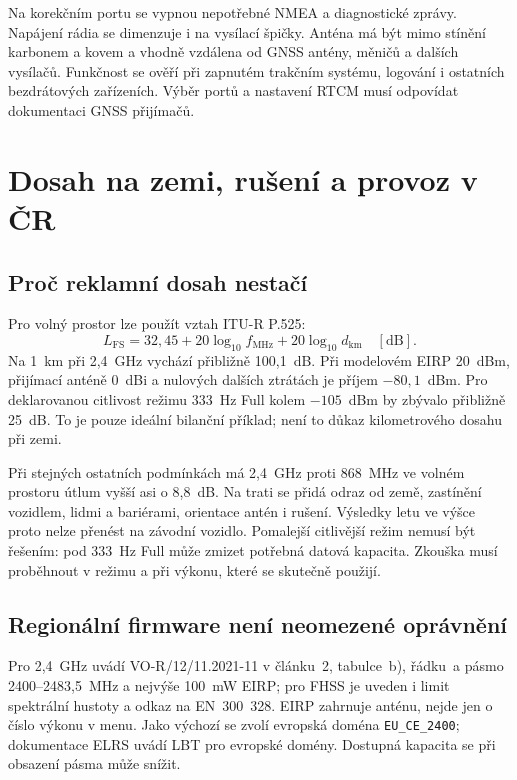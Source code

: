 \documentclass[11pt,a4paper]{article}
\begin{document}
Na korekčním portu se vypnou nepotřebné NMEA a diagnostické zprávy. Napájení rádia se dimenzuje i na vysílací špičky. Anténa má být mimo stínění karbonem a kovem a vhodně vzdálena od GNSS antény, měničů a dalších vysílačů. Funkčnost se ověří při zapnutém trakčním systému, logování i ostatních bezdrátových zařízeních. Výběr portů a nastavení RTCM musí odpovídat dokumentaci GNSS přijímačů.\cite{f9p,mosaic}

\section{Dosah na zemi, rušení a provoz v ČR}
\subsection{Proč reklamní dosah nestačí}
Pro volný prostor lze použít vztah ITU-R P.525:\cite{itu}
\begin{equation}
 L_{\mathrm{FS}}=32{,}45+20\log_{10}f_{\mathrm{MHz}}
                         +20\log_{10}d_{\mathrm{km}}\quad[\mathrm{dB}].
\end{equation}
Na 1~km při 2,4~GHz vychází přibližně 100,1~dB. Při modelovém EIRP 20~dBm, přijímací anténě 0~dBi a nulových dalších ztrátách je příjem $-80{,}1$~dBm. Pro deklarovanou citlivost režimu 333~Hz Full kolem $-105$~dBm by zbývalo přibližně 25~dB.\cite{signal} To je pouze ideální bilanční příklad; není to důkaz kilometrového dosahu při zemi.

Při stejných ostatních podmínkách má 2,4~GHz proti 868~MHz ve volném prostoru útlum vyšší asi o 8,8~dB. Na trati se přidá odraz od země, zastínění vozidlem, lidmi a bariérami, orientace antén i rušení. Výsledky letu ve výšce proto nelze přenést na závodní vozidlo. Pomalejší citlivější režim nemusí být řešením: pod 333~Hz Full může zmizet potřebná datová kapacita. Zkouška musí proběhnout v režimu a při výkonu, které se skutečně použijí.

\subsection{Regionální firmware není neomezené oprávnění}
Pro 2,4~GHz uvádí VO-R/12/11.2021-11 v článku~2, tabulce~b), řádku~a pásmo 2400--2483,5~MHz a nejvýše 100~mW EIRP; pro FHSS je uveden i limit spektrální hustoty a odkaz na EN~300~328. EIRP zahrnuje anténu, nejde jen o číslo výkonu v menu.\cite{ctu12} Jako výchozí se zvolí evropská doména \texttt{EU\_CE\_2400}; dokumentace ELRS uvádí LBT pro evropské domény.\cite{domains} Dostupná kapacita se při obsazení pásma může snížit.
\end{document}
